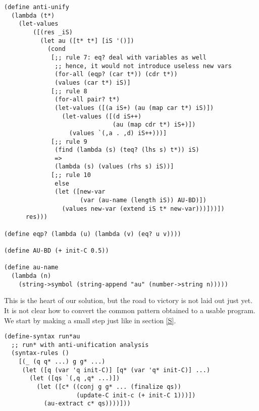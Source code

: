 \begin{lstlisting}
(define anti-unify
  (lambda (t*)
    (let-values
        ([(res _iS)
          (let au ([t* t*] [iS '()])
            (cond
             [;; rule 7: eq? deal with variables as well
              ;; hence, it would not introduce useless new vars
              (for-all (eqp? (car t*)) (cdr t*))
              (values (car t*) iS)]
             [;; rule 8
              (for-all pair? t*)
              (let-values ([(a iS+) (au (map car t*) iS)])
                (let-values ([(d iS++)
                              (au (map cdr t*) iS+)])
                  (values `(,a . ,d) iS++)))]
             [;; rule 9
              (find (lambda (s) (teq? (lhs s) t*)) iS)
              =>
              (lambda (s) (values (rhs s) iS))]
             [;; rule 10
              else
              (let ([new-var
                     (var (au-name (length iS)) AU-BD)])
                (values new-var (extend iS t* new-var)))]))])
      res)))

(define eqp? (lambda (u) (lambda (v) (eq? u v))))

(define AU-BD (+ init-C 0.5))

(define au-name
  (lambda (n)
    (string->symbol (string-append "au" (number->string n)))))
\end{lstlisting}

This is the heart of our solution, but the road to victory is not laid out just yet. It is not clear how to convert the common pattern obtained to a usable program. We start by making a small step just like in section \ref{S}.
\begin{lstlisting}
(define-syntax run*au
  ;; run* with anti-unification analysis
  (syntax-rules ()
    [(_ (q q* ...) g g* ...)
     (let ([q (var 'q init-C)] [q* (var 'q* init-C)] ...)
       (let ([qs `(,q ,q* ...)])
         (let ([c* ((conj g g* ... (finalize qs))
                    (update-C init-c (+ init-C 1)))])
           (au-extract c* qs))))]))
\end{lstlisting}

